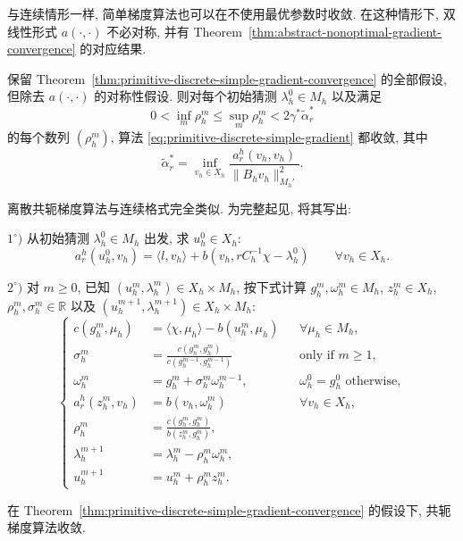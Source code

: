 与连续情形一样, 简单梯度算法也可以在不使用最优参数时收敛.
在这种情形下, 双线性形式 $a(\cdot,\cdot)$ 不必对称,
并有 Theorem~\ref{thm:abstract-nonoptimal-gradient-convergence} 的对应结果.

\setcounter{statement}{5}
\begin{Theorem}\label{thm:primitive-discrete-nonoptimal-gradient-convergence}
保留 Theorem~\ref{thm:primitive-discrete-simple-gradient-convergence} 的全部假设,
但除去 $a(\cdot,\cdot)$ 的对称性假设. 则对每个初始猜测
$\lambda_h^0\in M_h$ 以及满足
\[
0<\inf_m\rho_h^m\leq\sup_m\rho_h^m
<2\gamma^*\widetilde\alpha_r^*
\]
的每个数列 $(\rho_h^m)$, 算法
\eqref{eq:primitive-discrete-simple-gradient} 都收敛, 其中
\[
\widetilde\alpha_r^*
=\inf_{v_h\in X_h}
\frac{a_r^h(v_h,v_h)}{\|B_hv_h\|_{M_h'}^2}.
\]
\end{Theorem}

离散共轭梯度算法与连续格式完全类似. 为完整起见, 将其写出:

$1^\circ)$ 从初始猜测 $\lambda_h^0\in M_h$ 出发, 求 $u_h^0\in X_h$:
\[
a_r^h(u_h^0,v_h)
=\langle l,v_h\rangle+b(v_h,rC_h^{-1}\chi-\lambda_h^0)
\qquad\forall v_h\in X_h.
\]

$2^\circ)$ 对 $m\geq0$, 已知
$(u_h^m,\lambda_h^m)\in X_h\times M_h$, 按下式计算
$g_h^m,\omega_h^m\in M_h$, $z_h^m\in X_h$,
$\rho_h^m,\sigma_h^m\in\mathbb R$ 以及
$(u_h^{m+1},\lambda_h^{m+1})\in X_h\times M_h$:
\begin{equation}\label{eq:primitive-discrete-conjugate-gradient}
\left\{
\begin{aligned}
c(g_h^m,\mu_h)&=\langle\chi,\mu_h\rangle-b(u_h^m,\mu_h)
&&\forall\mu_h\in M_h,\\
\sigma_h^m&=\frac{c(g_h^m,g_h^m)}{c(g_h^{m-1},g_h^{m-1})}
&&\text{only if $m\geq1$},\\
\omega_h^m&=g_h^m+\sigma_h^m\omega_h^{m-1},
&&\omega_h^0=g_h^0\text{ otherwise},\\
a_r^h(z_h^m,v_h)&=b(v_h,\omega_h^m)
&&\forall v_h\in X_h,\\
\rho_h^m&=\frac{c(g_h^m,g_h^m)}{b(z_h^m,g_h^m)},\\
\lambda_h^{m+1}&=\lambda_h^m-\rho_h^m\omega_h^m,\\
u_h^{m+1}&=u_h^m+\rho_h^mz_h^m.
\end{aligned}
\right.
\end{equation}

\setcounter{statement}{6}
\begin{Theorem}\label{thm:primitive-discrete-conjugate-gradient-convergence}
在 Theorem~\ref{thm:primitive-discrete-simple-gradient-convergence} 的假设下,
共轭梯度算法收敛.
\end{Theorem}

